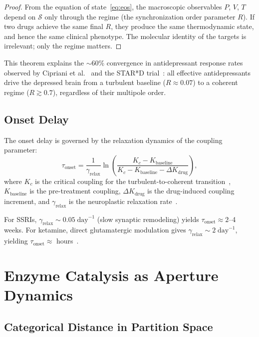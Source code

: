 \documentclass[10pt,twocolumn]{article}
\theoremstyle{definition}
\theoremstyle{remark}
\begin{document}
\begin{proof}
From the equation of state~\eqref{eq:eos}, the macroscopic
observables $P$, $V$, $T$ depend on $\mathcal{S}$ only through
the regime (the synchronization order parameter $R$).  If two
drugs achieve the same final $R$, they produce the same
thermodynamic state, and hence the same clinical phenotype.
The molecular identity of the targets is irrelevant; only the
regime matters.
\end{proof}

This theorem explains the $\sim$60\% convergence in antidepressant
response rates observed by Cipriani et al.~\cite{Cipriani2018}
and the STAR*D trial~\cite{Rush2006}: all effective antidepressants
drive the depressed brain from a turbulent baseline
($R \approx 0.07$) to a coherent regime ($R \gtrsim 0.7$),
regardless of their multipole order.

\subsection{Onset Delay}

The onset delay is governed by the relaxation dynamics
of the coupling parameter:
\begin{equation}\label{eq:onset}
  \tau_{\text{onset}} = \frac{1}{\gamma_{\text{relax}}}
  \ln\!\left(\frac{K_c - K_{\text{baseline}}}
  {K_c - K_{\text{baseline}} - \Delta K_{\text{drug}}}\right),
\end{equation}
where $K_c$ is the critical coupling for the turbulent-to-coherent
transition~\cite{Kuramoto1984}, $K_{\text{baseline}}$ is the
pre-treatment coupling, $\Delta K_{\text{drug}}$ is the
drug-induced coupling increment, and $\gamma_{\text{relax}}$ is
the neuroplastic relaxation rate~\cite{Leuchter2012}.

For SSRIs, $\gamma_{\text{relax}} \sim 0.05\;\text{day}^{-1}$
(slow synaptic remodeling) yields $\tau_{\text{onset}} \approx
2$--4 weeks.  For ketamine, direct glutamatergic modulation gives
$\gamma_{\text{relax}} \sim 2\;\text{day}^{-1}$, yielding
$\tau_{\text{onset}} \approx$ hours~\cite{Zarate2006}.

\section{Enzyme Catalysis as Aperture Dynamics}\label{sec:enzyme}

\subsection{Categorical Distance in Partition Space}
\end{document}
